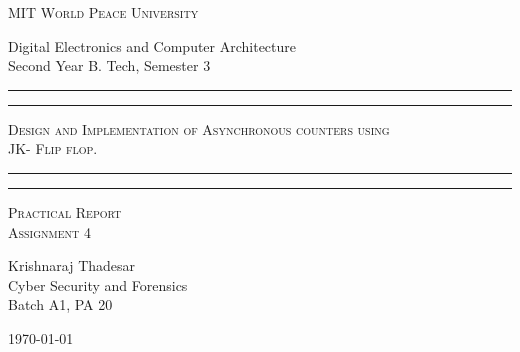 \documentclass[11pt]{article}
\begin{document}
\begin{titlepage}
	\centering


	\huge\textsc{
		MIT World Peace University
	}\\

	\vspace{0.75\baselineskip} %

	\LARGE{
		Digital Electronics and Computer Architecture\\
		Second Year B. Tech, Semester 3
	}

	\vfill %


	\rule{\textwidth}{1.6pt}\vspace*{-\baselineskip}\vspace*{2pt}
	\rule{\textwidth}{0.6pt}
	\vspace{0.75\baselineskip} %



	\huge{\textsc{
			Design and Implementation of Asynchronous counters using\\ JK- Flip flop.
		}} \\



	\vspace{0.5\baselineskip} %
	\rule{\textwidth}{0.6pt}\vspace*{-\baselineskip}\vspace*{2.8pt}
	\rule{\textwidth}{1.6pt}

	\vspace{1\baselineskip} %


	\LARGE\textsc{
		Practical Report\\
		Assignment 4
	} %
	\vfill


	\vspace{0.5\baselineskip} %

	\Large{
		Krishnaraj Thadesar \\
		Cyber Security and Forensics\\
		Batch A1, PA 20
	}


	\vspace{0.5\baselineskip} %
	\today

\end{titlepage}
\end{document}
